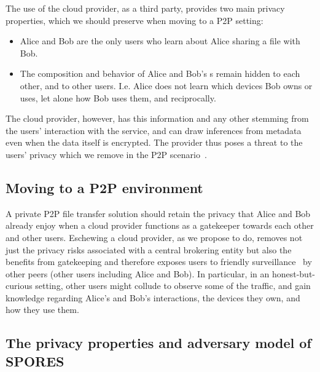 The use of the cloud provider, as a third party,
provides two main privacy properties, which we should preserve when
moving to a P2P setting:
\begin{itemize}
\item Alice and Bob are the only users who learn 
about Alice sharing a file with Bob.
\item The composition and behavior of Alice and Bob's \squad{}s remain
  hidden to each other, and to other users. I.e. Alice does not learn
  which devices Bob owns or uses, let alone how Bob uses them, and
  reciprocally.
\end{itemize} 
The cloud provider, however, has this information and any other
stemming from the users' interaction with the service, and can draw
inferences from metadata even when the data itself is encrypted. The
provider thus poses a threat to the users' privacy which we remove in
the P2P scenario~\cite{DevilInMetadata}.


\subsection{Moving to a P2P environment}
A private P2P file transfer solution should retain the privacy that
Alice and Bob already enjoy when a cloud provider functions as a
gatekeeper towards each other and other users.  Eschewing a cloud
provider, as we propose to do, removes not just the privacy risks
associated with a central brokering entity but also the benefits from
gatekeeping and therefore exposes users to friendly
surveillance~\cite{FriendlySurveillance} by other peers (other \name
users including Alice and Bob). In particular, in an
honest-but-curious setting, other users might collude to observe some
of the traffic, and gain knowledge regarding Alice's and Bob's
interactions, the devices they own, and how they use them.

\subsection{The privacy properties and adversary model of \acs*{SPORES}}

